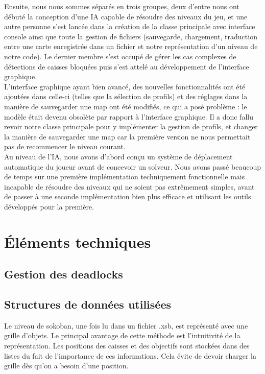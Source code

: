 \documentclass[a4paper,12pt]{article} %
\begin{document}
Ensuite, nous nous sommes séparés en trois groupes, deux d'entre nous ont débuté la conception d'une IA capable de résoudre des niveaux du jeu, et une autre personne s'est lancée dans la création de la classe principale avec interface console ainsi que toute la gestion de fichiers (sauvegarde, chargement, traduction entre une carte enregistrée dans un fichier et notre représentation d'un niveau de notre code). Le dernier membre s'est occupé de gérer les cas complexes de détections de caisses bloquées puis s'est attelé au développement de l'interface graphique.\\

L'interface graphique ayant bien avancé, des nouvelles fonctionnalités ont été ajoutées dans celle-ci (telles que la sélection de profils) et des réglages dans la manière de sauvegarder une map ont été modifiés, ce qui a posé problème : le modèle était devenu obsolète par rapport à l'interface graphique. Il a donc fallu revoir notre classe principale pour y implémenter la gestion de profils, et changer la manière de sauvegarder une map car la première version ne nous permettait pas de recommencer le niveau courant.\\

Au niveau de l'IA, nous avons d'abord conçu un système de déplacement automatique du joueur avant de concevoir un solveur. Nous avons passé beaucoup de temps sur une première implémentation techniquement fonctionnelle mais incapable de résoudre des niveaux qui ne soient pas extrêmement simples, avant de passer à une seconde implémentation bien plus efficace et utilisant les outils développés pour la première. 

\section{Éléments techniques}\label{et}

\subsection{Gestion des deadlocks}

\subsection{Structures de données utilisées}

Le niveau de sokoban, une fois lu dans un fichier .xsb, est représenté avec une grille d'objets. Le principal avantage de cette méthode est l'intuitivité de la représentation.
Les positions des caisses et des objectifs sont stockées dans des listes du fait de l'importance de ces informations. Cela évite de devoir charger la grille dès qu'on a besoin d'une position.\\
\end{document}
